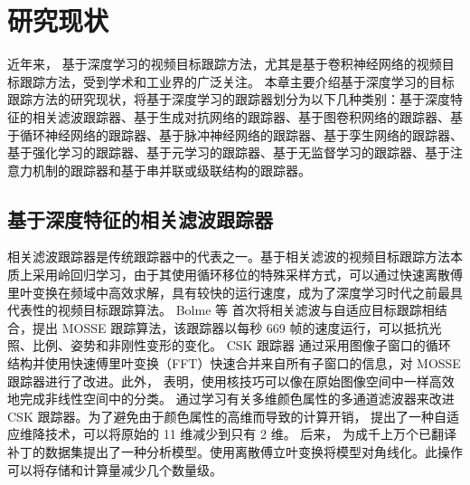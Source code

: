 \chapter{研究现状} \label{chap:related}
近年来，
基于深度学习的视频目标跟踪方法，尤其是基于卷积神经网络的视频目标跟踪方法，受到学术和工业界的广泛关注。
本章主要介绍基于深度学习的目标跟踪方法的研究现状，将基于深度学习的跟踪器划分为以下几种类别：基于深度特征的相关滤波跟踪器、基于生成对抗网络的跟踪器、基于图卷积网络的跟踪器、基于循环神经网络的跟踪器、基于脉冲神经网络的跟踪器、基于孪生网络的跟踪器、基于强化学习的跟踪器、基于元学习的跟踪器、基于无监督学习的跟踪器、基于注意力机制的跟踪器和基于串并联或级联结构的跟踪器。

\section{基于深度特征的相关滤波跟踪器}
相关滤波跟踪器是传统跟踪器中的代表之一。基于相关滤波的视频目标跟踪方法本质上采用岭回归学习，由于其使用循环移位的特殊采样方式，可以通过快速离散傅里叶变换在频域中高效求解，具有较快的运行速度，成为了深度学习时代之前最具代表性的视频目标跟踪算法。
Bolme 等 \cite{MOSSE} 首次将相关滤波与自适应目标跟踪相结合，提出 MOSSE 跟踪算法，该跟踪器以每秒 669 帧的速度运行，可以抵抗光照、比例、姿势和非刚性变形的变化。
CSK 跟踪器 \cite{Henriques2012ExploitingTC} 通过采用图像子窗口的循环结构并使用快速傅里叶变换（FFT）快速合并来自所有子窗口的信息，对 MOSSE 跟踪器进行了改进。此外，\cite{Henriques2012ExploitingTC} 表明，使用核技巧可以像在原始图像空间中一样高效地完成非线性空间中的分类。
\cite{Danelljan2014AdaptiveCA} 通过学习有关多维颜色属性的多通道滤波器来改进 CSK 跟踪器。为了避免由于颜色属性的高维而导致的计算开销，\cite{Danelljan2014AdaptiveCA} 提出了一种自适应维降技术，可以将原始的 11 维减少到只有 2 维。
后来，\cite{henriques2014high-speed} 为成千上万个已翻译补丁的数据集提出了一种分析模型。使用离散傅立叶变换将模型对角线化。此操作可以将存储和计算量减少几个数量级。

